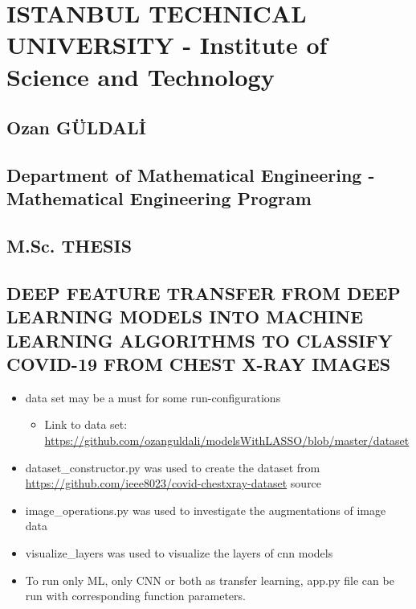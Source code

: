 \section*{ISTANBUL TECHNICAL UNIVERSITY - Institute of Science and
	Technology}\label{istanbul-technical-university---institute-of-science-and-technology}

\subsection*{Ozan GÜLDALİ}\label{ozan-guldali}

\subsection*{Department of Mathematical Engineering - Mathematical
	Engineering
	Program}\label{department-of-mathematical-engineering---mathematical-engineering-program}

\subsection*{M.Sc. THESIS}\label{m.sc.-thesis}

\subsection*{DEEP FEATURE TRANSFER FROM DEEP LEARNING MODELS INTO MACHINE
	LEARNING ALGORITHMS TO CLASSIFY COVID-19 FROM CHEST X-RAY IMAGES}\label{deep-feature-transfer-from-deep-learning-models-into-machine-learning-algorithms-to-classify-covid-19-from-chest-x-ray-and-demographic-information}


\begin{itemize}
	\item
	data set may be a must for some run-configurations
	
	\begin{itemize}
		\itemsep1pt\parskip0pt
		\item
		Link to data set:
		\url{https://github.com/ozanguldali/modelsWithLASSO/blob/master/dataset}\\
	\end{itemize}
	\item
	dataset\_constructor.py was used to create the dataset from
	\url{https://github.com/ieee8023/covid-chestxray-dataset} source
	\item
	image\_operations.py was used to investigate the augmentations of
	image data
	\item
	visualize\_layers was used to visualize the layers of cnn models
	\item
	To run only ML, only CNN or both as transfer learning, app.py file can
	be run with corresponding function parameters.
\end{itemize}

